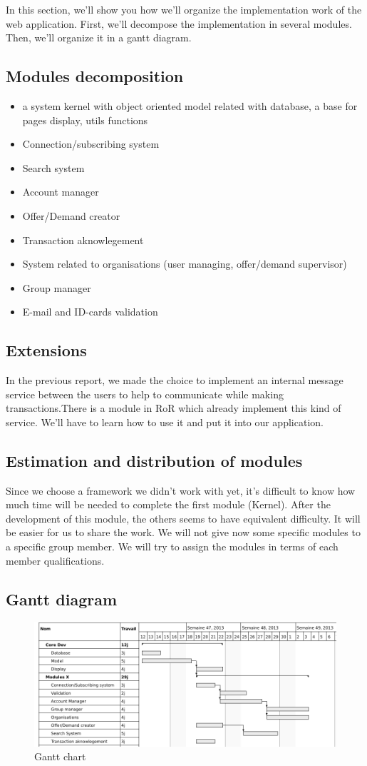 In this section, we'll show you how we'll organize the implementation work of the web application. First, we'll decompose the implementation in several modules. Then, we'll organize it in a gantt diagram. \\

\subsection{Modules decomposition}
\begin{itemize}
\item a system kernel with object oriented model related with database, a base for pages display, utils functions
\item Connection/subscribing system
\item Search system
\item Account manager
\item Offer/Demand creator
\item Transaction aknowlegement
\item System related to organisations (user managing, offer/demand supervisor)
\item Group manager
\item E-mail and ID-cards validation
\end{itemize}

\subsection{Extensions}
In the previous report, we made the choice to implement an internal message service between the users to help to communicate while making transactions.There is a module in RoR which already implement this kind of service. We'll have to learn how to use it and put it into our application. \\

\subsection{Estimation and distribution of modules}
Since we choose a framework we didn't work with yet, it's difficult to know how much time will be needed to complete the first module (Kernel). After the development of this module, the others seems to have equivalent difficulty. It will be easier for us to share the work. We will not give now some specific modules to a specific group member. We will try to assign the modules in terms of each member qualifications.

\subsection{Gantt diagram}
\begin{figure}[!ht]
	\begin{center}
		\includegraphics[width=\textwidth]{gantt_2_22_2_76.pdf}
		\caption{Gantt chart}
		\label{fig:gantt}
	\end{center}
\end{figure}